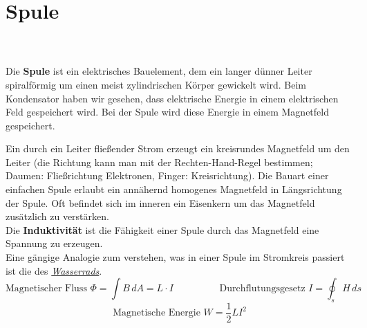 \documentclass{article}
\begin{document}
\section{Spule}
\vspace{-0.8\baselineskip}
\begin{mdframed}
\centering
\vspace{0.2\baselineskip}
\\
\vspace{0.5\baselineskip}
\raisebox{-0.5\height}{}\\
\justify
Die \textbf{Spule} ist ein elektrisches Bauelement, dem ein langer dünner Leiter spiralförmig um einen meist zylindrischen Körper gewickelt wird. Beim Kondensator haben wir gesehen, dass elektrische Energie in einem elektrischen Feld gespeichert wird. Bei der Spule wird diese Energie in einem Magnetfeld gespeichert.\\
\par\centering
\raisebox{-0.5\height}{}
\hspace{2\baselineskip}
\justify
Ein durch ein Leiter fließender Strom erzeugt ein kreisrundes Magnetfeld um den Leiter (die Richtung kann man mit der Rechten-Hand-Regel bestimmen; Daumen: Fließrichtung Elektronen, Finger: Kreisrichtung). Die Bauart einer einfachen Spule erlaubt ein annähernd homogenes Magnetfeld in Längsrichtung der Spule. Oft befindet sich im inneren ein Eisenkern um das Magnetfeld zusätzlich zu verstärken.\\
Die \textbf{Induktivität} ist die Fähigkeit einer Spule durch das Magnetfeld eine Spannung zu erzeugen.\\
Eine gängige Analogie zum verstehen, was in einer Spule im Stromkreis passiert ist die des \href{https://www.youtube.com/watch?v=KSylo01n5FY}{\textit{Wasserrads}}.
\[\text{Magnetischer Fluss } \Phi = \int B \, dA = L \cdot I \hspace{2cm} \text{Durchflutungsgesetz }I = \oint_s H \, ds\]
\[\text{Magnetische Energie } W = \frac{1}{2}LI^2\]
\end{mdframed}
\vspace{0.8\baselineskip}
\end{document}
